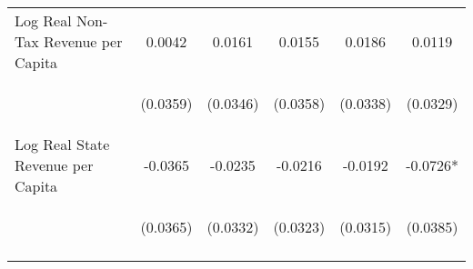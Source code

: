 \begin{center}
\begin{tabular}{lccccc}
\noalign{\smallskip}Log Real Non-Tax Revenue per Capita & \begin{scriptsize}0.0042\end{scriptsize} & \begin{scriptsize}0.0161\end{scriptsize} & \begin{scriptsize}0.0155\end{scriptsize} & \begin{scriptsize}0.0186\end{scriptsize} & \begin{scriptsize}0.0119\end{scriptsize}\\
 & \begin{scriptsize}(0.0359)\end{scriptsize} & \begin{scriptsize}(0.0346)\end{scriptsize} & \begin{scriptsize}(0.0358)\end{scriptsize} & \begin{scriptsize}(0.0338)\end{scriptsize} & \begin{scriptsize}(0.0329)\end{scriptsize}\\
\noalign{\smallskip}Log Real State Revenue per Capita & \begin{scriptsize}-0.0365\end{scriptsize} & \begin{scriptsize}-0.0235\end{scriptsize} & \begin{scriptsize}-0.0216\end{scriptsize} & \begin{scriptsize}-0.0192\end{scriptsize} & \begin{scriptsize}-0.0726*\end{scriptsize}\\
 & \begin{scriptsize}(0.0365)\end{scriptsize} & \begin{scriptsize}(0.0332)\end{scriptsize} & \begin{scriptsize}(0.0323)\end{scriptsize} & \begin{scriptsize}(0.0315)\end{scriptsize} & \begin{scriptsize}(0.0385)\end{scriptsize}\\
\noalign{\smallskip}\hline\end{tabular}\\
\end{center}
